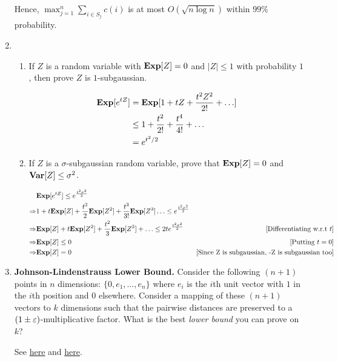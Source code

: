 \documentclass[11pt]{article}
\begin{document}
\begin{enumerate}
Hence, $\max_{j=1}^n \sum_{i\in S_j} c(i)$ is at most $O(\sqrt{n\log n})$ within $99\%$ probability.


\item 
\begin{enumerate}
	\item If $Z$ is a random variable with $\mathbf{Exp}[Z] = 0$ and $|Z| \leq 1$ with probability $1$, then prove $Z$ is $1$-subgaussian.
	
	\Sol 
	
	\begin{align*}
	 \mathbf{Exp}[e^{tZ}] &= \mathbf{Exp}[1 + tZ + \frac{t^2 Z^2}{2!} + \ldots]\\
	 &\le 1 + \frac{t^2}{2!} + \frac{t^4}{4!} + \ldots\\
	 &= e^{t^2/2}
	\end{align*}


	\item If $Z$ is a $\sigma$-subgaussian random variable, prove that $\mathbf{Exp}[Z] = 0$ and $\mathbf{Var}[Z] \leq \sigma^2$.
	
	\Sol
	
	\begin{align*}
	  &\mathbf{Exp}[e^{tZ}] \le e^{\frac{t^2 \sigma^2}{2}}&\\
	  \Rightarrow &1 + t\mathbf{Exp}[Z] + \frac{t^2}{2}\mathbf{Exp}[Z^2] + \frac{t^3}{3!}\mathbf{Exp}[Z^3] \ldots \le e^{\frac{t^2 \sigma^2}{2}}&\\
	  \Rightarrow &\mathbf{Exp}[Z] + t\mathbf{Exp}[Z^2] + \frac{t^2}{3}\mathbf{Exp}[Z^3] + \ldots \le 2te^{\frac{t^2 \sigma^2}{2}} &[\text{Differentiating w.r.t }t]\\
	  \Rightarrow &\mathbf{Exp}[Z] \le 0 &[\text{Putting }t=0]\\
	  \Rightarrow &\mathbf{Exp}[Z] = 0 &[\text{Since Z is subgaussian, -Z is subgaussian too}]
	\end{align*}

\end{enumerate}

\item {\bf Johnson-Lindenstrauss Lower Bound.} Consider the following $(n+1)$ points in $n$ dimensions: $\{0,e_1,\ldots,e_n\}$
where $e_i$ is the $i$th unit vector with $1$ in the $i$th position and $0$ elsewhere. 
Consider a mapping of these $(n+1)$ vectors to $k$ dimensions such that the pairwise distances are preserved to a $(1\pm \varepsilon)$-multiplicative factor.
What is the best {\em lower bound} you can prove on $k$? 

\Sol See \href{https://courses.cs.washington.edu/courses/cse522/14sp/lectures/lect10.pdf}{here} and \href{https://courses.cs.washington.edu/courses/cse522/14sp/lectures/lect11.pdf}{here}.

\end{enumerate}
\end{document}
